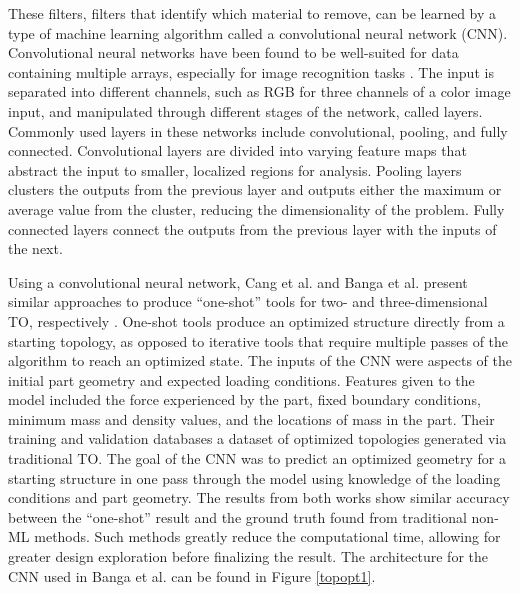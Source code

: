 These filters, filters that identify which material to remove, can be learned by a type of machine learning algorithm called a convolutional neural network (CNN). Convolutional neural networks have been found to be well-suited for data containing multiple arrays, especially for image recognition tasks \cite{Lecun2015}. The input is separated into different channels, such as RGB for three channels of a color image input, and manipulated through different stages of the network, called layers. Commonly used layers in these networks include convolutional, pooling, and fully connected. Convolutional layers are divided into varying feature maps that abstract the input to smaller, localized regions for analysis. Pooling layers clusters the outputs from the previous layer and outputs either the maximum or average value from the cluster, reducing the dimensionality of the problem. Fully connected layers connect the outputs from the previous layer with the inputs of the next.

Using a convolutional neural network, Cang et al. and Banga et al. present similar approaches to produce “one-shot” tools for two- and three-dimensional TO, respectively \cite{Cang2019,Banga2018}. One-shot tools produce an optimized structure directly from a starting topology, as opposed to iterative tools that require multiple passes of the algorithm to reach an optimized state. The inputs of the CNN were aspects of the initial part geometry and expected loading conditions. Features given to the model included the force experienced by the part, fixed boundary conditions, minimum mass and density values, and the locations of mass in the part. Their training and validation databases a dataset of optimized topologies generated via traditional TO. The goal of the CNN was to predict an optimized geometry for a starting structure in one pass through the model using knowledge of the loading conditions and part geometry. The results from both works show similar accuracy between the “one-shot” result and the ground truth found from traditional non-ML methods. Such methods greatly reduce the computational time, allowing for greater design exploration before finalizing the result. The architecture for the CNN used in Banga et al. can be found in Figure \ref{topopt1}.

